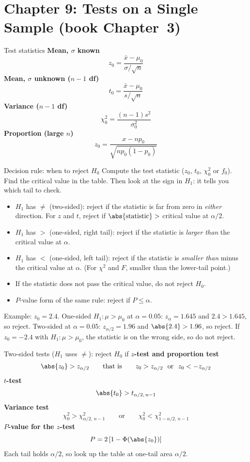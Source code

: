 \section{Chapter 9: Tests on a Single Sample (book Chapter~3)}

\begin{formulabox}{Test statistics}
\textbf{Mean, $\sigma$ known}
\[ z_0=\frac{\bar{x}-\mu_0}{\sigma/\sqrt n} \]
\textbf{Mean, $\sigma$ unknown ($n-1$ df)}
\[ t_0=\frac{\bar{x}-\mu_0}{s/\sqrt n} \]
\textbf{Variance ($n-1$ df)}
\[ \chi_0^2=\frac{(n-1)s^2}{\sigma_0^2} \]
\textbf{Proportion (large $n$)}
\[ z_0=\frac{x-np_0}{\sqrt{np_0(1-p_0)}} \]
\end{formulabox}

\begin{formulabox}{Decision rule: when to reject $H_0$}
Compute the test statistic ($z_0$, $t_0$, $\chi_0^2$ or $f_0$). Find the critical value in the table. Then look at the sign in $H_1$: it tells you which tail to check.
\begin{itemize}
  \item $H_1$ has $\ne$ (two-sided): reject if the statistic is far from zero in \emph{either} direction. For $z$ and $t$, reject if $\abs{\text{statistic}}>$ critical value at $\alpha/2$.
  \item $H_1$ has $>$ (one-sided, right tail): reject if the statistic is \emph{larger than} the critical value at $\alpha$.
  \item $H_1$ has $<$ (one-sided, left tail): reject if the statistic is \emph{smaller than} minus the critical value at $\alpha$. (For $\chi^2$ and $F$, smaller than the lower-tail point.)
  \item If the statistic does not pass the critical value, do not reject $H_0$.
  \item $P$-value form of the same rule: reject if $P\le\alpha$.
\end{itemize}
Example: $z_0=2.4$. One-sided $H_1:\mu>\mu_0$ at $\alpha=0.05$: $z_\alpha=1.645$ and $2.4>1.645$, so reject. Two-sided at $\alpha=0.05$: $z_{\alpha/2}=1.96$ and $\abs{2.4}>1.96$, so reject. If $z_0=-2.4$ with $H_1:\mu>\mu_0$, the statistic is on the wrong side, so do not reject.
\end{formulabox}

\begin{formulabox}{Two-sided tests ($H_1$ uses $\ne$): reject $H_0$ if}
\textbf{$z$-test and proportion test}
\[ \abs{z_0}>z_{\alpha/2}\qquad\text{that is}\qquad z_0>z_{\alpha/2}\ \text{ or }\ z_0<-z_{\alpha/2} \]
\textbf{$t$-test}
\[ \abs{t_0}>t_{\alpha/2,\,n-1} \]
\textbf{Variance test}
\[ \chi_0^2>\chi^2_{\alpha/2,\,n-1}\qquad\text{or}\qquad\chi_0^2<\chi^2_{1-\alpha/2,\,n-1} \]
\textbf{$P$-value for the $z$-test}
\[ P=2\,[1-\Phi(\abs{z_0})] \]
Each tail holds $\alpha/2$, so look up the table at one-tail area $\alpha/2$.
\end{formulabox}

